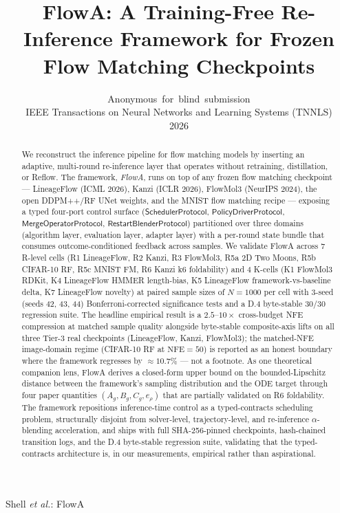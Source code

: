 \documentclass[journal,twocolumn,final]{IEEEtran}
\newcommand{\NFE}{\mathrm{NFE}}
\newcommand{\egap}{e_\rho}
\newcommand{\sheetA}{A_g}
\newcommand{\sheetB}{B_g}
\newcommand{\sheetC}{C_g}
\begin{document}
\title{FlowA: A Training-Free Re-Inference Framework for Frozen\\Flow Matching Checkpoints}

\author{Anonymous~for~blind~submission\\
        IEEE Transactions on Neural Networks and Learning Systems (TNNLS)\\
        2026}
%
{Shell \MakeLowercase{\textit{et al.}}: FlowA}

\begin{abstract}
We reconstruct the inference pipeline for flow matching models by inserting
an adaptive, multi-round re-inference layer that operates without retraining,
distillation, or Reflow. The framework, \emph{FlowA}, runs on top of any frozen
flow matching checkpoint --- LineageFlow (ICML 2026), Kanzi
(ICLR 2026), FlowMol3 (NeurIPS 2024), the open DDPM++/RF UNet weights, and
the MNIST flow matching recipe --- exposing a typed four-port control surface
($\mathsf{SchedulerProtocol}$, $\mathsf{PolicyDriverProtocol}$,
$\mathsf{MergeOperatorProtocol}$, $\mathsf{RestartBlenderProtocol}$) partitioned
over three domains (algorithm layer, evaluation layer, adapter layer) with a
per-round state bundle that consumes outcome-conditioned feedback across
samples. We validate FlowA across 7 R-level cells (R1 LineageFlow, R2 Kanzi, R3
FlowMol3, R5a 2D Two Moons, R5b CIFAR-10 RF, R5c MNIST FM, R6 Kanzi k6
foldability) and 4 K-cells (K1 FlowMol3 RDKit, K4 LineageFlow HMMER length-bias,
K5 LineageFlow framework-vs-baseline delta, K7 LineageFlow novelty) at paired
sample sizes of $N = 1000$ per cell with 3-seed (seeds 42, 43, 44)
Bonferroni-corrected significance tests and a D.4 byte-stable 30/30 regression
suite. The headline
empirical result is a $2.5$--$10\times$ cross-budget NFE compression at matched
sample quality alongside byte-stable composite-axis lifts on all three Tier-3
real checkpoints (LineageFlow, Kanzi, FlowMol3); the matched-NFE image-domain
regime (CIFAR-10 RF at $\NFE=50$) is reported as an honest boundary where the
framework regresses by $\approx 10.7\%$ --- not a footnote. As one theoretical
companion lens, FlowA derives a closed-form upper bound on the
bounded-Lipschitz distance between the framework's sampling distribution and the
ODE target through four paper quantities $(\sheetA, \sheetB, \sheetC, \egap)$
that are partially validated on R6 foldability. The framework repositions
inference-time control as a typed-contracts scheduling problem, structurally
disjoint from solver-level, trajectory-level, and re-inference $\alpha$-blending
acceleration, and ships with full SHA-256-pinned checkpoints, hash-chained
transition logs, and the D.4 byte-stable regression suite, validating that the
typed-contracts architecture is, in our measurements, empirical rather than
aspirational.
\end{abstract}
\end{document}
